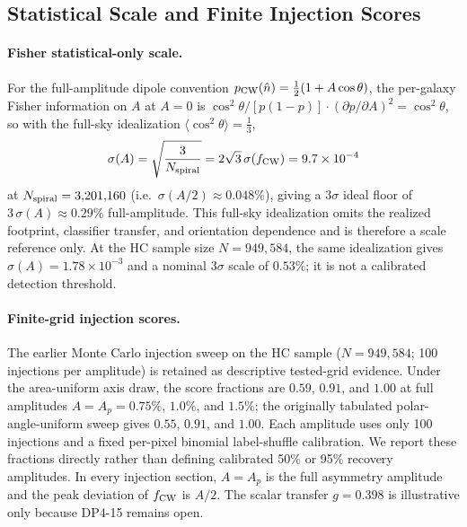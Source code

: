 \documentclass[aps,prd,twocolumn,superscriptaddress,preprintnumbers,nofootinbib,longbibliography,floatfix]{revtex4-2}
\begin{document}
\subsection{Statistical Scale and Finite Injection Scores}
\label{sec:sensitivity}

\paragraph{Fisher statistical-only scale.}
For the full-amplitude dipole convention $p_{\rm CW}(\hat n)=\tfrac12(1+A\cos\theta)$, the per-galaxy Fisher information on $A$ at $A=0$ is $\cos^2\theta/[p(1-p)] \cdot (\partial p/\partial A)^2 = \cos^2\theta$, so with the full-sky idealization $\langle\cos^2\theta\rangle=\tfrac13$,
\begin{equation}
\sigma(A) = \sqrt{\frac{3}{N_{\rm spiral}}} = 2\sqrt{3}\,\sigma(f_{\rm CW})
= 9.7\times10^{-4}
\label{eq:fisher_floor}
\end{equation}
at $N_{\rm spiral}=3{,}201{,}160$ (i.e.\ $\sigma(A/2)\approx0.048\%$), giving a $3\sigma$ ideal floor of $3\,\sigma(A)\approx0.29\%$ full-amplitude. This full-sky idealization omits the realized footprint, classifier transfer, and orientation dependence and is therefore a scale reference only. At the HC sample size $N=949{,}584$, the same idealization gives $\sigma(A)=1.78\times10^{-3}$ and a nominal $3\sigma$ scale of $0.53\%$; it is not a calibrated detection threshold.

\paragraph{Finite-grid injection scores.}
The earlier Monte Carlo injection sweep on the HC sample ($N=949{,}584$; 100 injections per amplitude) is retained as descriptive tested-grid evidence. Under the area-uniform axis draw, the score fractions are $0.59$, $0.91$, and $1.00$ at full amplitudes $A=A_p=0.75\%$, $1.0\%$, and $1.5\%$; the originally tabulated polar-angle-uniform sweep gives $0.55$, $0.91$, and $1.00$. Each amplitude uses only 100 injections and a fixed per-pixel binomial label-shuffle calibration. We report these fractions directly rather than defining calibrated 50\% or 95\% recovery amplitudes. In every injection section, $A=A_p$ is the full asymmetry amplitude and the peak deviation of $f_{\rm CW}$ is $A/2$. The scalar transfer $g=0.398$ is illustrative only because DP4-15 remains open.
\end{document}
